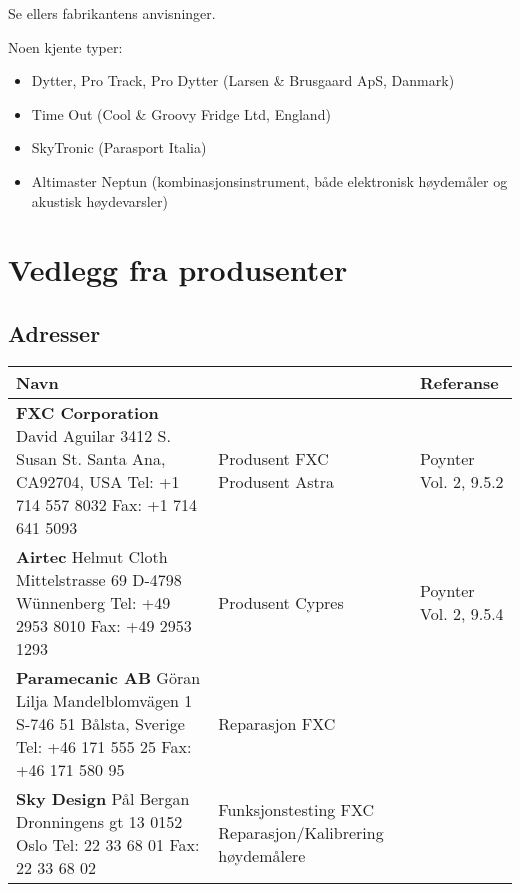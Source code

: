 Se ellers fabrikantens anvisninger.

Noen kjente typer:
\begin{itemize}
\item Dytter, Pro Track, Pro Dytter (Larsen \& Brusgaard ApS, Danmark)
\item Time Out (Cool \& Groovy Fridge Ltd, England)
\item SkyTronic (Parasport Italia)
\item Altimaster Neptun (kombinasjonsinstrument, både elektronisk høydemåler og akustisk høydevarsler)
\end{itemize}

\section{Vedlegg fra produsenter}
\subsection{Adresser}

\begin{table}
	\begin{tabular}{ | p{5cm} | p{2cm} | p{3cm} | }
		\hline
		Navn & & Referanse \\
		\hline
		\textbf{FXC Corporation}
		David Aguilar
		3412 S. Susan St. Santa Ana, CA92704, USA
		Tel: +1 714 557 8032
		Fax: +1 714 641 5093 &
		Produsent FXC
		Produsent Astra &
		Poynter Vol. 2, 9.5.2 \\
		\hline
		\textbf{Airtec}
		Helmut Cloth
		Mittelstrasse 69
		D-4798 Wünnenberg
		Tel: +49 2953 8010
		Fax: +49 2953 1293 &
		Produsent Cypres &
		Poynter Vol. 2, 9.5.4 \\
		\hline
		\textbf{Paramecanic AB}
		Göran Lilja
		Mandelblomvägen 1
		S-746 51 Bålsta, Sverige
		Tel: +46 171 555 25
		Fax: +46 171 580 95 &
		Reparasjon FXC & \\
		\hline
		\textbf{Sky Design}
		Pål Bergan
		Dronningens gt 13
		0152 Oslo
		Tel: 22 33 68 01
		Fax: 22 33 68 02 &
		Funksjonstesting FXC
		Reparasjon/Kalibrering høydemålere & \\
		\hline
	\end{tabular}
\end{table}

